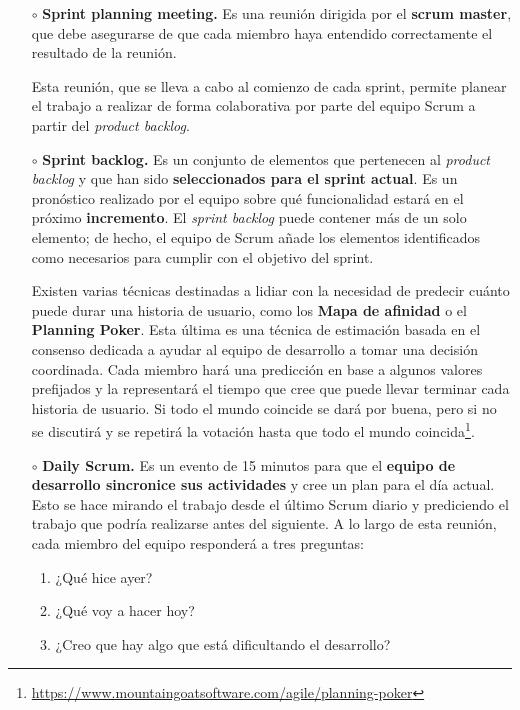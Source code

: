 \begin{itemize}
\begin{itemize}
    \item [$\circ$] \textbf{Sprint planning meeting.} Es una reunión dirigida por el \textbf{scrum master}, que debe asegurarse de que cada miembro haya entendido correctamente el resultado de la reunión.
    
    Esta reunión, que se lleva a cabo al comienzo de cada sprint, permite planear el trabajo a realizar de forma colaborativa por parte del equipo Scrum a partir del \textit{product backlog}.
    
    \item [$\circ$] \textbf{Sprint backlog.} Es un conjunto de elementos que pertenecen al \textit{product backlog} y que han sido \textbf{seleccionados para el sprint actual}. Es un pronóstico realizado por el equipo sobre qué funcionalidad estará en el próximo \textbf{incremento}. El \textit{sprint backlog} puede contener más de un solo elemento; de hecho, el equipo de Scrum añade los elementos identificados como necesarios para cumplir con el objetivo del sprint.
    
    Existen varias técnicas destinadas a lidiar con la necesidad de predecir cuánto puede durar una historia de usuario, como los \textbf{Mapa de afinidad} o el \textbf{Planning Poker}. Esta última es una técnica de estimación basada en el consenso dedicada a ayudar al equipo de desarrollo a tomar una decisión coordinada. Cada miembro hará una predicción en base a algunos valores prefijados y la representará el tiempo que cree que puede llevar terminar cada historia de usuario. Si todo el mundo coincide se dará por buena, pero si no se discutirá y se repetirá la votación hasta que todo el mundo coincida\footnote{\url{https://www.mountaingoatsoftware.com/agile/planning-poker}}.
        
    \item [$\circ$] \textbf{Daily Scrum.} Es un evento de 15 minutos para que el \textbf{equipo de desarrollo sincronice sus actividades} y cree un plan para el día actual. Esto se hace mirando el trabajo desde el último Scrum diario y prediciendo el trabajo que podría realizarse antes del siguiente. A lo largo de esta reunión, cada miembro del equipo responderá a tres preguntas:
    
    \begin{enumerate}
    \item ¿Qué hice ayer?
    \item ¿Qué voy a hacer hoy?
    \item ¿Creo que hay algo que está dificultando el desarrollo?
    \end{enumerate}
    

\end{itemize}
\end{itemize}
